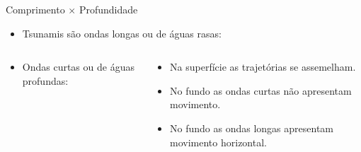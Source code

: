 \documentclass{beamer}
\begin{document}
\begin{frame}{Comprimento $\times$ Profundidade}
  \begin{itemize}
  \item \alert{Tsunamis são ondas longas ou de águas rasas:}
  \end{itemize}
  \begin{columns}
    \begin{column}{6cm} 
      \begin{itemize}
      \item Ondas curtas ou de águas profundas:
      \end{itemize}
    \end{column}
    \begin{column}{6cm}
      \begin{itemize}
      \item Na superfície as trajetórias se assemelham. 
      \item No fundo as ondas curtas não apresentam movimento.
      \item No fundo as ondas longas apresentam movimento horizontal.
      \end{itemize}
    \end{column}
  \end{columns}
\end{frame}
\end{document}

